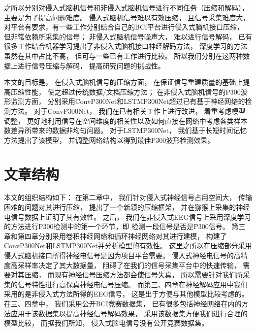 之所以分别对侵入式脑机信号和非侵入式脑机信号进行不同任务（压缩和解码）， 主要是为了提高问题难度。 侵入式脑机信号难以有效压缩， 且信号采集难度大，对平台有要求，有一些工作分别结合自己的BCI平台进行侵入式脑机接口压缩， 但非常依赖所采集的信号；  非侵入式脑机信号噪声大， 难以进行信号解码， 已有很多工作结合机器学习提出了非侵入式脑机接口神经解码方法， 深度学习的方法虽然在其中占比不高， 但可与一些已有工作进行比较。 所以我们分别在这两种数据上进行信号压缩与解码， 提高研究问题的挑战性。 


本文的目标是， 在侵入式脑机信号的压缩方面， 在保证信号重建质量的基础上提高压缩性能， 使之超过传统数据/文档压缩方法； 在非侵入式脑机信号的P300波形监测方面， 分别采用ConvP300Net和LSTMP300Net超过已有基于神经网络的检测方法。  对于ConvP300Net， 我们在已有相关工作上进行改进， 着重考虑模型调整， 更好地利用信号在空间维度的相关性以及如何直接在网络中考虑各类样本数差异所带来的数据非均匀问题。 对于LSTMP300Net， 我们基于长短时间记忆方法提出了该模型， 并调整网络结构以得到最佳P300波形检测效果。



\section{文章结构}

本文的组织结构如下： 在第二章中， 我们针对侵入式神经信号占用空间大， 传输困难的问题对其进行压缩， 提出了一个新颖的压缩框架， 并在猕猴上采集的神经电信号数据上证明了其有效性。 之后， 我们在非侵入式EEG信号上采用深度学习的方法进行P300检测中的第一个环节，即 检测一段信号是否是P300信号。 第三章和第四章分别采用卷积神经网络和循环神经网络对其进行建模， 构建了ConvP300Net和LSTMP300Net并分析模型的有效性。 这里之所以在压缩部分采用侵入式脑机接口所得神经电信号是因为项目平台需要。 侵入式神经电信号的高精度高采样率决定了其大数据量， 阻碍了在我们的信号采集平台中的快速传输， 需要对其压缩， 而现有神经信号压缩方法都会使信号失真， 所以需要针对我们所采集的信号特性进行高保真神经电信号压缩。 而第三、四章在神经解码应用中我们采用的是非侵入式方法所得的EEG信号， 这是出于方便与其他模型比较考虑的。 在三、四章中， 我们采用公开BCI竞赛数据集\cite{blankertz2006bci}， 已有很多包括神经网络在内的方法应用于该数据集以提高神经信号解码效果， 采用该数据集方便我们进行合理的模型比较， 而据我们所知， 侵入式脑电信号没有公开竞赛数据集。









